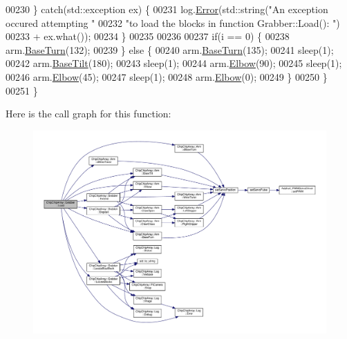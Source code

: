 \begin{DoxyCode}
00230             \} \textcolor{keywordflow}{catch}(std::exception ex) \{
00231                 log.\hyperlink{classChipChipArray_1_1Log_aba7b7b0555f49f4dcf15f4b9fd3e6b34}{Error}(std::string(\textcolor{stringliteral}{"An exception occured attempting "}
00232                             \textcolor{stringliteral}{"to load the blocks in function Grabber::Load(): "}) 
00233                         + ex.what());
00234             \}
00235 
00236 
00237             \textcolor{keywordflow}{if}(i == 0) \{
00238                 arm.\hyperlink{classChipChipArray_1_1Arm_addaedfe85ff2b14ff00c344fc4b40cd6}{BaseTurn}(132);
00239             \} \textcolor{keywordflow}{else} \{
00240                 arm.\hyperlink{classChipChipArray_1_1Arm_addaedfe85ff2b14ff00c344fc4b40cd6}{BaseTurn}(135);
00241                 sleep(1);
00242                 arm.\hyperlink{classChipChipArray_1_1Arm_a8b077a3791d9fc5ef285c1520fe4c5d8}{BaseTilt}(180);
00243                 sleep(1);
00244                 arm.\hyperlink{classChipChipArray_1_1Arm_ac45149e03abfac230b75156bb42e8417}{Elbow}(90);
00245                 sleep(1);
00246                 arm.\hyperlink{classChipChipArray_1_1Arm_ac45149e03abfac230b75156bb42e8417}{Elbow}(45);
00247                 sleep(1);
00248                 arm.\hyperlink{classChipChipArray_1_1Arm_ac45149e03abfac230b75156bb42e8417}{Elbow}(0);
00249             \}
00250         \}
00251     \}
\end{DoxyCode}


Here is the call graph for this function\+:
\nopagebreak
\begin{figure}[H]
\begin{center}
\leavevmode
\includegraphics[width=350pt]{classChipChipArray_1_1Grabber_a56639f8f9ba9468bce4b6d69ceb2eb54_cgraph}
\end{center}
\end{figure}




